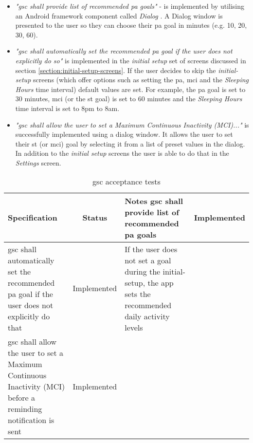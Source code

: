 \begin{itemize}
    \item \textit{"\gls{gsc} shall provide list of recommended \gls{pa} goals"} - is implemented by utilising an Android framework component called \textit{Dialog} \citep{androiddialogs_2017}. A Dialog window is presented to the user so they can choose their \gls{pa} goal in minutes (e.g. 10, 20, 30, 60).
    \item \textit{"\gls{gsc} shall automatically set the recommended \gls{pa} goal if the user does not explicitly do so"} is implemented in the \textit{initial setup} set of screens discussed in section \ref{section:initial-setup-screens}. If the user decides to skip the \textit{initial-setup} screens (which offer options such as setting the \gls{pa}, \gls{mci} and the \textit{Sleeping Hours} time interval) default values are set. For example, the \gls{pa} goal is set to 30 minutes, \gls{mci} (or the \gls{st} goal) is set to 60 minutes and the \textit{Sleeping Hours} time interval is set to 8pm to 8am. 
    \item \textit{"\gls{gsc} shall allow the user to set a Maximum Continuous Inactivity (MCI)..."} is successfully implemented using a dialog window. It allows the user to set their \gls{st} (or \gls{mci}) goal by selecting it from a list of preset values in the dialog. In addition to the \textit{initial setup} screens the user is able to do that in the \textit{Settings} screen. 
\end{itemize}
 

\begin{table}[ht]
    \centering
    \tabulinesep=1.5mm
  \begin{longtabu} to \textwidth {|X|c|X|}
    \hline
      \textbf{Specification}
      & \textbf{Status}
      & \textbf{Notes}
    \endhead \hline
    \gls{gsc} shall provide list of recommended \gls{pa} goals
      & Implemented
      & 
    \\ \hline
    \gls{gsc} shall automatically set the recommended \gls{pa} goal if the user does not explicitly do that 
    & Implemented
    & If the user does not set a goal during the initial-setup, the app sets the recommended daily activity levels
    \\ \hline
    \gls{gsc} shall allow the user to set a Maximum Continuous Inactivity (MCI) before a reminding notification is sent 
    & Implemented
    & 
    \\ \hline
 \end{longtabu}
    \caption{\gls{gsc} acceptance tests}
    \label{tab:gsc-acceptance-tests}
\end{table}




